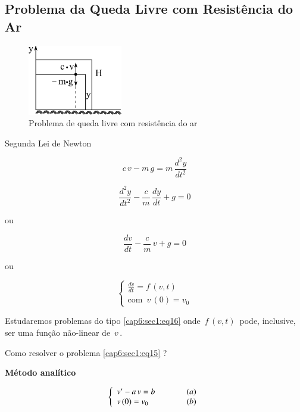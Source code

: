 \subsection{Problema da Queda Livre com Resistência do Ar}

\begin{figure}[htb]
 \centering
 \includegraphics[scale=1.0]{capitulos/capitulo6/figuras/intro2.png}
 \caption{Problema de queda livre com resistência do ar}
 \label{fig:intro2}
\end{figure}

Segunda Lei de Newton

\begin{equation}
 \label{cap6:sec1:eq13}
 c \, v - m \, g = m \, \frac{d^2y}{dt^2}
\end{equation}

\begin{equation}
 \label{cap6:sec1:eq14}
 \frac{d^2y}{dt^2} - \frac{c}{m} \, \frac{dy}{dt} + g = 0
\end{equation}

ou

\begin{equation}
 \label{cap6:sec1:eq15}
 \frac{dv}{dt} - \frac{c}{m} \, v + g = 0
\end{equation}

ou

\begin{equation}
 \label{cap6:sec1:eq16}
 \left\{
  \begin{array}{l}
   \displaystyle \frac{dv}{dt} = f \, (v, t) \\
   \mbox{com } \, v \, (0) = v_0
  \end{array}
 \right.
\end{equation}

Estudaremos problemas do tipo \ref{cap6:sec1:eq16} onde $ \, f \, (v, t) \, $ pode, inclusive, ser uma função não-linear de $ \, v \, $.

Como resolver o problema \ref{cap6:sec1:eq15} ?

\textbf{Método analítico}

\begin{equation}
 \left\{
  \begin{array}{lr}
   \label{cap6:sec1:eq17}
   v' - a \, v = b & \hspace*{1cm} (a) \\
   v \, (0) = v_0 & \hspace*{1cm} (b)
  \end{array}
 \right.
\end{equation}

